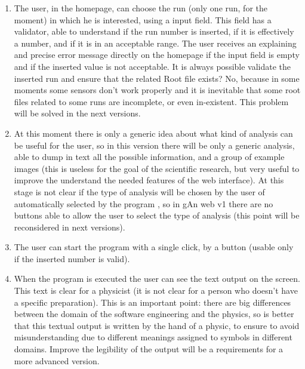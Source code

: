 \begin{enumerate}

\item The user, in the homepage, can choose the run (only one run, for the moment) in which he is interested, using a input field. This field has a validator, able to understand if the run number is inserted, if it is effectively a number, and if it is in an acceptable range. The user receives an explaining and precise error message directly on the homepage if the input field is empty and if the inserted value is not acceptable. It is always possible validate the inserted run and ensure that the related Root file exists? No, because in some moments some sensors don't work properly and it is inevitable that some root files related to some runs are incomplete, or even in-existent. This problem will be solved in the next versions.

\item At this moment there is only a generic idea about what kind of analysis can be useful for the user, so in this version there will be only a generic analysis, able to dump in text all the possible information, and a group of example images (this is useless for the goal of the scientific research, but very useful to improve the understand the needed features of the web interface).
At this stage is not clear if the type of analysis will be chosen by the user of automatically selected by the program , so in gAn web v1 there are no buttons able to allow the user to select the type of analysis (this point will be reconsidered in next versions).

\item The user can start the program with a single click, by a button (usable only if the inserted number is valid).

\item When the program is executed the user can see the text output on the screen. This text is clear for a physicist (it is not clear for a person who doesn't have a specific preparation). This is an important point: there are big differences between the domain of the software engineering and the physics, so is better that this textual output is written by the hand of a physic, to ensure to avoid misunderstanding due to different meanings assigned to symbols in different domains. Improve the legibility of the output will be a requirements for a more advanced version. 


\end{enumerate}
